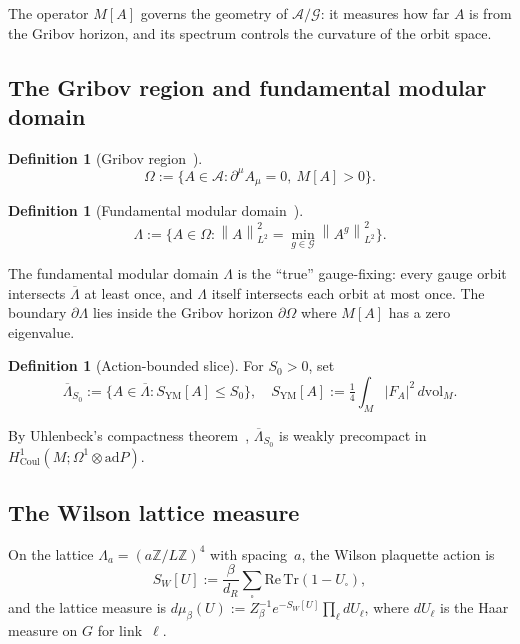 \documentclass[11pt,a4paper]{amsart}
\theoremstyle{definition}
\newtheorem{definition}[theorem]{Definition}
\theoremstyle{remark}
\newcommand{\Z}{\mathbb{Z}}
\newcommand{\calA}{\mathcal{A}}
\newcommand{\calG}{\mathcal{G}}
\newcommand{\norm}[1]{\left\lVert#1\right\rVert}
\newcommand{\Tr}{\mathrm{Tr}}
\newcommand{\ad}{\mathrm{ad}}
\newcommand{\Coul}{\mathrm{Coul}}
\newcommand{\dvol}{\,d\mathrm{vol}}
\begin{document}
The operator $M[A]$ governs the geometry of $\calA/\calG$: it measures
how far $A$ is from the Gribov horizon, and its spectrum controls the
curvature of the orbit space.

\subsection{The Gribov region and fundamental modular domain}

\begin{definition}[Gribov region~\cite{Gribov1978}]
\[
\Omega := \{A \in \calA : \partial^\mu A_\mu = 0,\ M[A] > 0\}.
\]
\end{definition}

\begin{definition}[Fundamental modular domain~\cite{Singer1978,DellAntonioZwanziger1991}]
\[
\Lambda := \{A \in \Omega : \norm{A}_{L^2}^2 = \min_{g \in \calG} \norm{A^g}_{L^2}^2\}.
\]
\end{definition}

The fundamental modular domain $\Lambda$ is the ``true'' gauge-fixing:
every gauge orbit intersects $\overline{\Lambda}$ at least once, and
$\Lambda$ itself intersects each orbit at most once. The boundary
$\partial\Lambda$ lies inside the Gribov horizon $\partial\Omega$ where
$M[A]$ has a zero eigenvalue.

\begin{definition}[Action-bounded slice]
For $S_0 > 0$, set
\[
\overline{\Lambda}_{S_0} := \{A \in \overline{\Lambda} : S_{\mathrm{YM}}[A] \leq S_0\},
\quad
S_{\mathrm{YM}}[A] := \tfrac{1}{4}\int_M |F_A|^2 \dvol_M.
\]
\end{definition}

By Uhlenbeck's compactness theorem~\cite{Uhlenbeck1982}, $\overline{\Lambda}_{S_0}$
is weakly precompact in $H^1_\Coul(M; \Omega^1 \otimes \ad P)$.

\subsection{The Wilson lattice measure}

On the lattice $\Lambda_a = (a\Z/L\Z)^4$ with spacing~$a$, the Wilson
plaquette action is
\begin{equation}\label{eq:wilson}
S_W[U] := \frac{\beta}{d_R} \sum_{\square} \mathrm{Re}\,\Tr(1 - U_\square),
\end{equation}
and the lattice measure is $d\mu_\beta(U) := Z_\beta^{-1} e^{-S_W[U]} \prod_\ell dU_\ell$,
where $dU_\ell$ is the Haar measure on $G$ for link~$\ell$.
\end{document}
